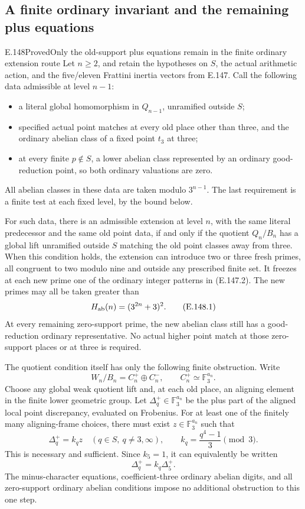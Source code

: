 \subsection{A finite ordinary invariant and the remaining plus equations}

\begin{result}{E.148}{Proved}{Only the old-support plus equations remain in the finite ordinary extension route}
Let \(n\ge2\), and retain the hypotheses on \(S\),
the actual arithmetic action, and the five/eleven
Frattini inertia vectors from E.147.
Call the following data admissible at level \(n-1\):
\begin{itemize}
\item a literal global homomorphism in \(Q_{n-1}\),
unramified outside \(S\);
\item specified actual point matches at every old
place other than three, and the ordinary abelian
class of a fixed point \(t_3\) at three;
\item at every finite \(p\notin S\), a lower
abelian class represented by an ordinary
good-reduction point, so both ordinary
valuations are zero.
\end{itemize}
All abelian classes in these data are taken modulo
\(3^{n-1}\). The last requirement is a finite
test at each fixed level, by the bound below.

For such data, there is an admissible extension
at level \(n\), with the same literal predecessor
and the same old point data, if and only if
the quotient \(Q_n/B_n\) has a global lift
unramified outside \(S\) matching the old
point classes away from three.
When this condition holds, the extension can
introduce two or three fresh primes, all
congruent to two modulo nine and outside
any prescribed finite set.
It freezes at each new prime one of the
ordinary integer patterns in (E.147.2).
The new primes may all be taken greater than
\[
                H_{\rm ab}(n)=(3^{2n}+3)^2 .
 \tag{E.148.1}
\]
At every remaining zero-support prime,
the new abelian class still has a
good-reduction ordinary representative.
No actual higher point match at those
zero-support places or at three is required.

The quotient condition itself has only the
following finite obstruction.
Write
\[
 W_n/B_n=C_n^+\oplus C_n^-,
 \qquad C_n^+\simeq\mathbb F_3^{a_n}.
 \]
Choose any global weak quotient lift and,
at each old place, an aligning element
in the finite lower geometric group.
Let
\(\Delta_q^+\in\mathbb F_3^{a_n}\)
be the plus part of the aligned local
point discrepancy, evaluated on Frobenius.
For at least one of the finitely many
aligning-frame choices, there must exist
\(z\in\mathbb F_3^{a_n}\) such that
\[
 \Delta_q^+=k_qz\quad(q\in S,\ q\ne3,\infty),
 \qquad
 k_q=\frac{q^4-1}{3}\pmod3.
 \tag{E.148.2}
\]
This is necessary and sufficient.
Since \(k_5=1\), it can equivalently be
written
\[
                         \Delta_q^+=k_q\Delta_5^+.
 \tag{E.148.3}
\]
The minus-character equations, coefficient-three
ordinary abelian digits, and all zero-support
ordinary abelian conditions impose no additional
obstruction to this one step.


\end{result}
